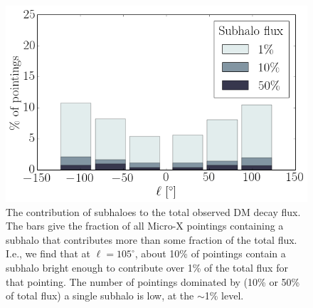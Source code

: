\documentclass[aps,prd,10pt,twocolumn,superscriptaddress,showpacs]{revtex4-1}
\begin{document}
\begin{figure}[h!]
\centering
\includegraphics[width=1.0\columnwidth]{subhalo_flux.png}
\caption{ 
	The contribution of subhaloes to the total observed DM decay flux. 
	The bars give the fraction of all Micro-X pointings containing a subhalo that
	contributes more than some fraction of the total flux. I.e., we find that at $\ell=105^\circ$,
	about 10\% of pointings contain a subhalo bright enough to contribute over 1\% of the total flux
	for that pointing. The number of pointings dominated by (10\% or 50\% of total flux) a single subhalo is low, at
	the $\sim$1\% level.
}
\label{fig:subhalo_flux}
\end{figure}
\end{document}

